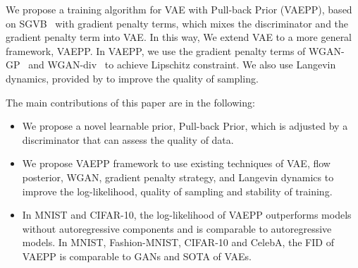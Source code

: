 We propose a training algorithm for VAE with Pull-back Prior (VAEPP), based on SGVB~\cite{kingma2014auto} with gradient penalty terms, which mixes the discriminator and the gradient penalty term into VAE. In this way, We extend VAE to a more general framework, VAEPP. In VAEPP, we use the gradient penalty terms of WGAN-GP~\cite{gulrajani2017improved} and WGAN-div~\cite{wu2018wasserstein} to achieve Lipschitz constraint. We also use Langevin dynamics, provided by \cite{kumar2019maximum} to improve the quality of sampling. 

The main contributions of this paper are in the following:
\begin{itemize}
	\item We propose a novel learnable prior, Pull-back Prior, which is adjusted by a discriminator that can assess the quality of data. 
	\item We propose VAEPP framework to use existing techniques of VAE, \EG flow posterior, WGAN, \EG gradient penalty strategy, and Langevin dynamics to improve the log-likelihood, quality of sampling and stability of training. 
	\item In MNIST and CIFAR-10, the log-likelihood of VAEPP outperforms models without autoregressive components and is comparable to autoregressive models. In MNIST, Fashion-MNIST, CIFAR-10 and CelebA,  the FID of VAEPP is comparable to GANs and SOTA of VAEs. 
\end{itemize}
